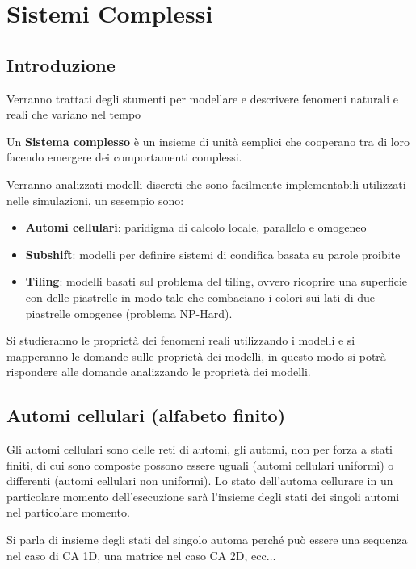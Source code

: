 \chapter{Sistemi Complessi}
\section{Introduzione}
Verranno trattati degli stumenti per modellare e descrivere fenomeni naturali e reali
che variano nel tempo
\begin{definizione}
    Un \textbf{Sistema complesso} è un insieme di unità semplici che cooperano tra
    di loro facendo emergere dei comportamenti complessi.
\end{definizione}
Verranno analizzati modelli discreti che sono facilmente implementabili utilizzati
nelle simulazioni, un sesempio sono:
\begin{itemize}
    \item \textbf{Automi cellulari}: paridigma di calcolo locale, parallelo e omogeneo
    \item \textbf{Subshift}: modelli per definire sistemi di condifica basata su
          parole proibite
    \item \textbf{Tiling}: modelli basati sul problema del tiling, ovvero ricoprire
          una superficie con delle piastrelle in modo tale che combaciano i colori sui
          lati di due piastrelle omogenee (problema NP-Hard).
\end{itemize}

Si studieranno le proprietà dei fenomeni reali utilizzando i modelli e si mapperanno
le domande sulle proprietà dei modelli, in questo modo si potrà rispondere alle
domande analizzando le proprietà dei modelli.

\section{Automi cellulari (alfabeto finito)}
Gli automi cellulari sono delle reti di automi, gli automi, non per forza a stati
finiti, di cui sono composte possono essere uguali (automi cellulari uniformi) o differenti (automi cellulari non
uniformi). Lo stato dell'automa cellurare in un particolare momento dell'esecuzione
sarà l'insieme degli stati dei singoli automi nel particolare momento.

\begin{nota}
    Si parla di insieme degli stati del singolo automa perché può essere una
    sequenza nel caso di CA 1D, una matrice nel caso CA 2D, ecc$\dots$
\end{nota}

